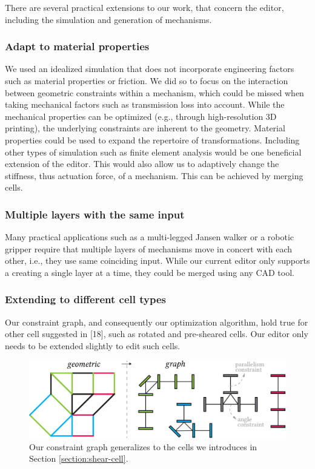 There are several practical extensions to our work, that concern the editor, including the simulation and generation of mechanisms. 

\subsubsection{Adapt to material properties}
We used an idealized simulation that does not incorporate engineering factors such as material properties or friction. We did so to focus on the interaction between geometric constraints within a mechanism, which could be missed when taking mechanical factors such as transmission loss into account. While the mechanical properties can be optimized (e.g., through high-resolution 3D printing), the underlying constraints are inherent to the geometry. Material properties could be used to expand the repertoire of transformations. Including other types of simulation such as finite element analysis would be one beneficial extension of the editor. This would also allow us to adaptively change the stiffness, thus actuation force, of a mechanism. This can be achieved by merging cells.

\subsubsection{Multiple layers with the same input}
Many practical applications such as a multi-legged Jansen walker or a robotic gripper require that multiple layers of mechanisms move in concert with each other, i.e., they use same coinciding input.  While our current editor only supports a creating a single layer at a time, they could be merged using any CAD tool.

\subsubsection{Extending to different cell types}
Our constraint graph, and consequently our optimization algorithm, hold true for other cell suggested in [18], such as rotated and pre-sheared cells. Our editor only needs to be extended slightly to edit such cells.
 
\begin{figure} [h]
    \includegraphics[width=\textwidth]{chapters/understanding-metamaterial-mechanisms-FIG/20-generalized-2D-constraint-graph.png}
    \caption[Short figure name.]{Our constraint graph generalizes to the cells we introduces in Section \ref{section:shear-cell}.
    \label{fig:20-generalized-2D-constraint-graph}}
\end{figure}

